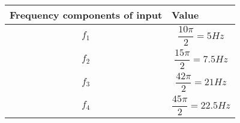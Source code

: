 \begin{tabular}{|p{4cm}|p{2.8cm}|}
    \hline
    Frequency components of input & Value   \\ \hline 
    $$f_1$$ & $$\frac{10\pi}{2}=5Hz$$ \\ \hline
    $$f_2$$ & $$\frac{15\pi}{2}=7.5Hz$$  \\ \hline
    $$f_3$$ & $$\frac{42\pi}{2}=21Hz$$  \\ \hline
    $$f_4$$ & $$\frac{45\pi}{2}=22.5Hz$$    \\ \hline
\end{tabular}
